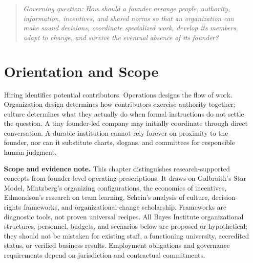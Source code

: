 
\begin{quote}
\textit{Governing question: How should a founder arrange people, authority, information, incentives, and shared norms so that an organization can make sound decisions, coordinate specialized work, develop its members, adapt to change, and survive the eventual absence of its founder?}
\end{quote}

\vspace{1.5pt}

\section*{Orientation and Scope}

Hiring identifies potential contributors. Operations designs the flow of work. Organization design determines how contributors exercise authority together; culture determines what they actually do when formal instructions do not settle the question. A tiny founder-led company may initially coordinate through direct conversation. A durable institution cannot rely forever on proximity to the founder, nor can it substitute charts, slogans, and committees for responsible human judgment.

\textbf{Scope and evidence note.} This chapter distinguishes research-supported concepts from founder-level operating prescriptions. It draws on Galbraith's Star Model, Mintzberg's organizing configurations, the economics of incentives, Edmondson's research on team learning, Schein's analysis of culture, decision-rights frameworks, and organizational-change scholarship. Frameworks are diagnostic tools, not proven universal recipes. All Bayes Institute organizational structures, personnel, budgets, and scenarios below are proposed or hypothetical; they should not be mistaken for existing staff, a functioning university, accredited status, or verified business results. Employment obligations and governance requirements depend on jurisdiction and contractual commitments.

